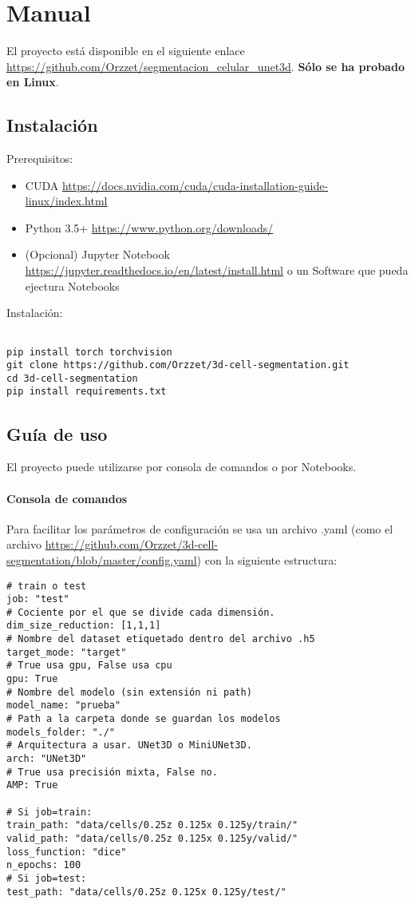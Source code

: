 \chapter{Manual}\label{manual}

El proyecto está disponible en el siguiente enlace \url{https://github.com/Orzzet/segmentacion_celular_unet3d}. \textbf{Sólo se ha probado en Linux}.

\section{Instalación}

Prerequisitos:

\begin{itemize}
\item CUDA \url{https://docs.nvidia.com/cuda/cuda-installation-guide-linux/index.html}
\item Python 3.5+ \url{https://www.python.org/downloads/}
\item (Opcional) Jupyter Notebook \url{https://jupyter.readthedocs.io/en/latest/install.html} o un Software que pueda ejectura Notebooks
\end{itemize}


Instalación:

\begin{verbatim}

pip install torch torchvision
git clone https://github.com/Orzzet/3d-cell-segmentation.git
cd 3d-cell-segmentation
pip install requirements.txt

\end{verbatim}

\section{Guía de uso}
El proyecto puede utilizarse por consola de comandos o por Notebooks.

\subsubsection{Consola de comandos}

Para facilitar los parámetros de configuración se usa un archivo .yaml (como el archivo \url{https://github.com/Orzzet/3d-cell-segmentation/blob/master/config.yaml}) con la siguiente estructura:
\begin{verbatim}
# train o test
job: "test" 
# Cociente por el que se divide cada dimensión.
dim_size_reduction: [1,1,1]
# Nombre del dataset etiquetado dentro del archivo .h5
target_mode: "target" 
# True usa gpu, False usa cpu
gpu: True
# Nombre del modelo (sin extensión ni path)
model_name: "prueba"
# Path a la carpeta donde se guardan los modelos 
models_folder: "./"
# Arquitectura a usar. UNet3D o MiniUNet3D. 
arch: "UNet3D"
# True usa precisión mixta, False no. 
AMP: True

# Si job=train:
train_path: "data/cells/0.25z 0.125x 0.125y/train/"
valid_path: "data/cells/0.25z 0.125x 0.125y/valid/"
loss_function: "dice"
n_epochs: 100
# Si job=test:
test_path: "data/cells/0.25z 0.125x 0.125y/test/"

\end{verbatim}

